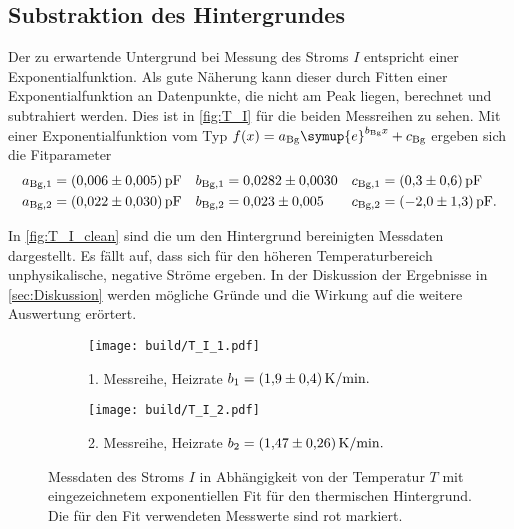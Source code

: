 \subsection{Substraktion des Hintergrundes}
\label{sec:Hintergrund}
Der zu erwartende Untergrund bei Messung des Stroms $I$ entspricht einer Exponentialfunktion. Als gute Näherung kann dieser durch Fitten einer Exponentialfunktion
an Datenpunkte, die nicht am Peak liegen, berechnet und subtrahiert werden. Dies ist in \autoref{fig:T_I} für die beiden Messreihen zu sehen. Mit einer Exponentialfunktion
vom Typ $f(x) = a_{\text{Bg}}\symup{e}^{b_{\text{Bg}}x} + c_{\text{Bg}}$ ergeben sich die Fitparameter
\begin{align*}
    a_{\text{Bg}, 1} & = \qty{0.006+-0.005}{\pico\farad} & b_{\text{Bg}, 1} &= \num{0.0282+-0.0030} & c_{\text{Bg}, 1} &= \qty{0.3+-0.6}{\pico\farad} \\
    a_{\text{Bg}, 2} & = \qty{0.022+-0.030}{\pico\farad} & b_{\text{Bg}, 2} &= \num{0.023+-0.005}   & c_{\text{Bg}, 2} &= \qty{-2.0+-1.3}{\pico\farad}. \\
\end{align*}

In \autoref{fig:T_I_clean} sind die um den Hintergrund bereinigten Messdaten dargestellt. Es fällt auf, dass sich für den höheren Temperaturbereich unphysikalische,
negative Ströme ergeben. In der Diskussion der Ergebnisse in \autoref{sec:Diskussion} werden mögliche Gründe und die Wirkung auf die weitere Auswertung erörtert.

\begin{figure}
    \centering
    \begin{subfigure}{\textwidth}
        \centering
        \texttt{[image: build/T\_I\_1.pdf]}
        \caption{1. Messreihe, Heizrate $b_1 = \qty{1.9+-0.4}{\kelvin\per\minute}.$}
        \label{fig:T_I_1}
    \end{subfigure}
    \begin{subfigure}{\textwidth}
        \centering
        \texttt{[image: build/T\_I\_2.pdf]}
        \caption{2. Messreihe, Heizrate $b_2 = \qty{1.47+-0.26}{\kelvin\per\minute}.$}
        \label{fig:T_I_2}
    \end{subfigure}
    \caption{Messdaten des Stroms $I$ in Abhängigkeit von der Temperatur $T$ mit eingezeichnetem exponentiellen Fit für den thermischen Hintergrund. Die für den Fit %
    verwendeten Messwerte sind rot markiert.}
    \label{fig:T_I}
\end{figure}


